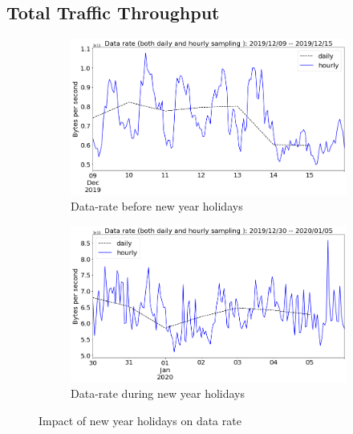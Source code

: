 \documentclass[10pt, journal, letterpaper]{IEEEtran}
\newcommand\linearFigSze{0.48}
\begin{document}
\subsection{Total Traffic Throughput}
\begin{figure}
    \begin{subfigure}{\linearFigSze\textwidth}
          \centering
          \includegraphics[width=\columnwidth]{img/BCH2_byterate.png}
          \caption{Data-rate before new year holidays}
          \label{fig:BCH2_bps}
    \end{subfigure}
    \begin{subfigure}{\linearFigSze\textwidth}
          \centering
          \includegraphics[width=\columnwidth]{img/CH2_byterate.png}
          \caption{Data-rate during new year holidays}
          \label{fig:CH2_bps}
    \end{subfigure}
    \caption{Impact of new year holidays on data rate}
    \label{fig:datarate_BCH_CH}
\end{figure}
\end{document}
